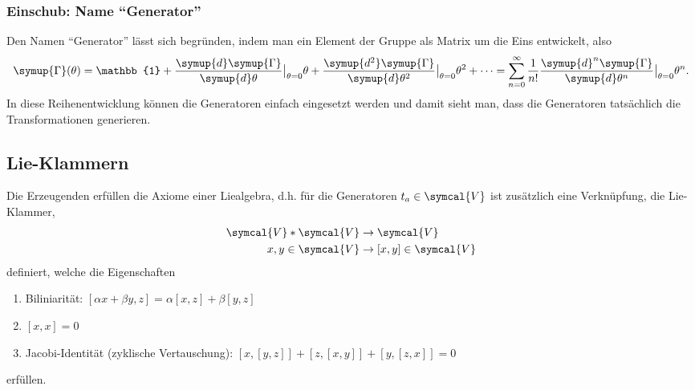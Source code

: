 \documentclass[
  captions=tableheading,  %
  titlepage=firstiscover, %
]{scrartcl}
\begin{document}
\subsubsection{Einschub: Name \enquote{Generator}}
Den Namen \enquote{Generator} lässt sich begründen, indem man ein Element der Gruppe als Matrix um die Eins entwickelt, also 
\begin{equation*}
  \symup{\Gamma}(\theta) = \mathbb{1} + \frac{\symup{d}\symup{\Gamma}}{\symup{d} \theta} \big |_{\theta = 0} \theta + 
  \frac{\symup{d^2}\symup{\Gamma}}{\symup{d} \theta^2} \big |_{\theta = 0} \theta^2 + \cdots  = \sum_{n=0}^{\infty}\frac{1}{n!}
  \frac{\symup{d}^n\symup{\Gamma}}{\symup{d} \theta^n} \big |_{\theta = 0} \theta^n .
\end{equation*}
In diese Reihenentwicklung können die Generatoren einfach eingesetzt werden und damit sieht man, dass 
die Generatoren tatsächlich die Transformationen generieren.
\subsection{Lie-Klammern}
Die Erzeugenden erfüllen die Axiome einer Liealgebra, d.h. für die Generatoren $t_a \in \symcal{V}$ ist 
zusätzlich eine Verknüpfung, die Lie-Klammer, 
\begin{align*}
  \symcal{V} * \symcal{V} &\to \symcal{V} \\
  x,y \in \symcal{V}      &\to [x,y] \in \symcal{V}
\end{align*}
definiert, welche die Eigenschaften 
\begin{enumerate}
  \item Biliniarität: $[\alpha x + \beta y, z] = \alpha [x,z] + \beta [y,z]$
  \item $[x,x] = 0$
  \item Jacobi-Identität (zyklische Vertauschung): $[x, [y,z]] + [z,[x,y]] + [y,[z,x]] = 0$
\end{enumerate}
erfüllen.
\end{document}
